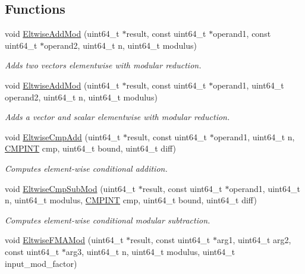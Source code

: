 \subsection*{Functions}
\begin{DoxyCompactItemize}
\item 
void \hyperlink{namespaceintel_1_1hexl_a319244a133f57825ba7e593ad5c71709}{Eltwise\+Add\+Mod} (uint64\+\_\+t $\ast$result, const uint64\+\_\+t $\ast$operand1, const uint64\+\_\+t $\ast$operand2, uint64\+\_\+t n, uint64\+\_\+t modulus)
\begin{DoxyCompactList}\small\item\em Adds two vectors elementwise with modular reduction. \end{DoxyCompactList}\item 
void \hyperlink{namespaceintel_1_1hexl_a8e0884463658eae11b6f1c6dfeb50b40}{Eltwise\+Add\+Mod} (uint64\+\_\+t $\ast$result, const uint64\+\_\+t $\ast$operand1, uint64\+\_\+t operand2, uint64\+\_\+t n, uint64\+\_\+t modulus)
\begin{DoxyCompactList}\small\item\em Adds a vector and scalar elementwise with modular reduction. \end{DoxyCompactList}\item 
void \hyperlink{namespaceintel_1_1hexl_a5c4fd2ceb53b94efa5f5a959d7ee9819}{Eltwise\+Cmp\+Add} (uint64\+\_\+t $\ast$result, const uint64\+\_\+t $\ast$operand1, uint64\+\_\+t n, \hyperlink{namespaceintel_1_1hexl_abdcc9d2d5bb10fa95d5f143874508006}{C\+M\+P\+I\+NT} cmp, uint64\+\_\+t bound, uint64\+\_\+t diff)
\begin{DoxyCompactList}\small\item\em Computes element-\/wise conditional addition. \end{DoxyCompactList}\item 
void \hyperlink{namespaceintel_1_1hexl_a78bf86d32140e39d8f99d474ccd0e226}{Eltwise\+Cmp\+Sub\+Mod} (uint64\+\_\+t $\ast$result, const uint64\+\_\+t $\ast$operand1, uint64\+\_\+t n, uint64\+\_\+t modulus, \hyperlink{namespaceintel_1_1hexl_abdcc9d2d5bb10fa95d5f143874508006}{C\+M\+P\+I\+NT} cmp, uint64\+\_\+t bound, uint64\+\_\+t diff)
\begin{DoxyCompactList}\small\item\em Computes element-\/wise conditional modular subtraction. \end{DoxyCompactList}\item 
void \hyperlink{namespaceintel_1_1hexl_a5b65d563391b4a1a5041633aeb118aa5}{Eltwise\+F\+M\+A\+Mod} (uint64\+\_\+t $\ast$result, const uint64\+\_\+t $\ast$arg1, uint64\+\_\+t arg2, const uint64\+\_\+t $\ast$arg3, uint64\+\_\+t n, uint64\+\_\+t modulus, uint64\+\_\+t input\+\_\+mod\+\_\+factor)

\end{DoxyCompactItemize}
